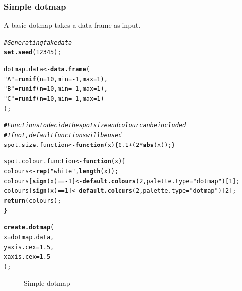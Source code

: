 \documentclass[letterpaper]{article}\usepackage[]{graphicx}\usepackage[]{color}
\makeatletter
\newcommand{\hlnum}[1]{\textcolor[rgb]{0.686,0.059,0.569}{#1}}%
\newcommand{\hlstr}[1]{\textcolor[rgb]{0.192,0.494,0.8}{#1}}%
\newcommand{\hlcom}[1]{\textcolor[rgb]{0.678,0.584,0.686}{\textit{#1}}}%
\newcommand{\hlopt}[1]{\textcolor[rgb]{0,0,0}{#1}}%
\newcommand{\hlstd}[1]{\textcolor[rgb]{0.345,0.345,0.345}{#1}}%
\newcommand{\hlkwa}[1]{\textcolor[rgb]{0.161,0.373,0.58}{\textbf{#1}}}%
\newcommand{\hlkwb}[1]{\textcolor[rgb]{0.69,0.353,0.396}{#1}}%
\newcommand{\hlkwc}[1]{\textcolor[rgb]{0.333,0.667,0.333}{#1}}%
\newcommand{\hlkwd}[1]{\textcolor[rgb]{0.737,0.353,0.396}{\textbf{#1}}}%
\newenvironment{kframe}{%
 \def\at@end@of@kframe{}%
 \ifinner\ifhmode%
  \def\at@end@of@kframe{\end{minipage}}%
  \begin{minipage}{\columnwidth}%
 \fi\fi%
 \def\FrameCommand##1{\hskip\@totalleftmargin \hskip-\fboxsep
 \colorbox{shadecolor}{##1}\hskip-\fboxsep
     \hskip-\linewidth \hskip-\@totalleftmargin \hskip\columnwidth}%
 \MakeFramed {\advance\hsize-\width
   \@totalleftmargin\z@ \linewidth\hsize
   \@setminipage}}%
 {\par\unskip\endMakeFramed%
 \at@end@of@kframe}
\newenvironment{knitrout}{}{} %
\makeatother
\begin{document}
\subsubsection{Simple dotmap}
A basic dotmap takes a data frame as input.
\begin{knitrout}
\color{fgcolor}\begin{kframe}
\begin{alltt}
\hlcom{# Generating fake data}
\hlkwd{set.seed}\hlstd{(}\hlnum{12345}\hlstd{);}

\hlstd{dotmap.data} \hlkwb{<-} \hlkwd{data.frame}\hlstd{(}
    \hlstr{"A"} \hlstd{=} \hlkwd{runif}\hlstd{(}\hlkwc{n} \hlstd{=} \hlnum{10}\hlstd{,} \hlkwc{min} \hlstd{=} \hlopt{-}\hlnum{1}\hlstd{,} \hlkwc{max} \hlstd{=} \hlnum{1}\hlstd{),}
    \hlstr{"B"} \hlstd{=} \hlkwd{runif}\hlstd{(}\hlkwc{n} \hlstd{=} \hlnum{10}\hlstd{,} \hlkwc{min} \hlstd{=} \hlopt{-}\hlnum{1}\hlstd{,} \hlkwc{max} \hlstd{=} \hlnum{1}\hlstd{),}
    \hlstr{"C"} \hlstd{=} \hlkwd{runif}\hlstd{(}\hlkwc{n} \hlstd{=} \hlnum{10}\hlstd{,} \hlkwc{min} \hlstd{=} \hlopt{-}\hlnum{1}\hlstd{,} \hlkwc{max} \hlstd{=} \hlnum{1}\hlstd{)}
    \hlstd{);}

\hlcom{# Functions to decide the spot size and colour can be included}
\hlcom{# If not, default functions will be used}
\hlstd{spot.size.function} \hlkwb{<-} \hlkwa{function}\hlstd{(}\hlkwc{x}\hlstd{) \{} \hlnum{0.1} \hlopt{+} \hlstd{(}\hlnum{2} \hlopt{*} \hlkwd{abs}\hlstd{(x)); \}}

\hlstd{spot.colour.function} \hlkwb{<-} \hlkwa{function}\hlstd{(}\hlkwc{x}\hlstd{) \{}
    \hlstd{colours} \hlkwb{<-} \hlkwd{rep}\hlstd{(}\hlstr{"white"}\hlstd{,} \hlkwd{length}\hlstd{(x));}
    \hlstd{colours[}\hlkwd{sign}\hlstd{(x)} \hlopt{== -}\hlnum{1}\hlstd{]} \hlkwb{<-} \hlkwd{default.colours}\hlstd{(}\hlnum{2}\hlstd{,} \hlkwc{palette.type} \hlstd{=} \hlstr{"dotmap"}\hlstd{)[}\hlnum{1}\hlstd{];}
    \hlstd{colours[}\hlkwd{sign}\hlstd{(x)} \hlopt{==}  \hlnum{1}\hlstd{]} \hlkwb{<-} \hlkwd{default.colours}\hlstd{(}\hlnum{2}\hlstd{,} \hlkwc{palette.type} \hlstd{=} \hlstr{"dotmap"}\hlstd{)[}\hlnum{2}\hlstd{];}
    \hlkwd{return}\hlstd{(colours);}
    \hlstd{\}}

\hlkwd{create.dotmap}\hlstd{(}
    \hlkwc{x} \hlstd{= dotmap.data,}
    \hlkwc{yaxis.cex} \hlstd{=} \hlnum{1.5}\hlstd{,}
    \hlkwc{xaxis.cex} \hlstd{=} \hlnum{1.5}
    \hlstd{);}
\end{alltt}
\end{kframe}\begin{figure}[]


{\centering {} 

}

\caption[Simple dotmap]{Simple dotmap\label{fig:dotmap1}}
\end{figure}


\end{knitrout}
\end{document}
